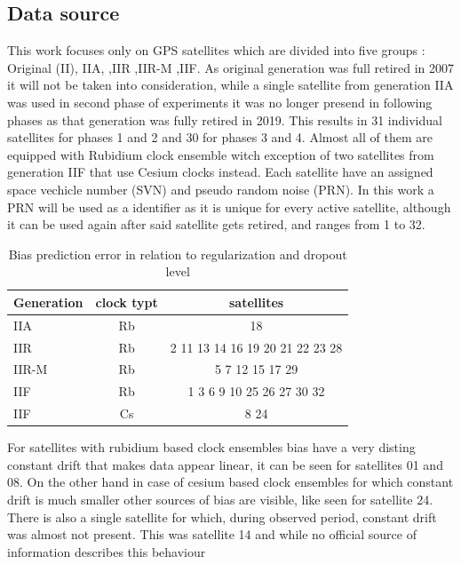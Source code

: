 \documentclass{kybernetika}
\begin{document}
\subsection{Data source}
This work focuses only on GPS satellites which are divided into five groups :
Original (II), IIA, ,IIR ,IIR-M ,IIF.
As original generation was full retired in 2007 it will not be taken into consideration, while
a single satellite from generation IIA was used in second phase of experiments it was no longer
presend in following phases as that generation was fully retired in 2019.
This results in 31 individual satellites for phases 1 and 2 and 30 for phases 3 and 4.
Almost all of them are equipped with Rubidium clock ensemble witch exception of two satellites
from generation IIF that use Cesium clocks instead.
Each satellite have an assigned space vechicle number (SVN) and pseudo random noise (PRN).
In this work a PRN will be used as a identifier as it is unique for every active satellite, 
although it can be used again after said satellite gets retired, and ranges from 1 to 32.
\begin{table}[ht] \label{table:2}
\parindent0pt
\caption{Bias prediction error in relation to regularization and dropout level}
\centering
\begin{tabular}{ l  c  c }
  \hline
  \hline
  Generation& clock typt& satellites\\  \hline
  IIA & Rb& 18\\  
  IIR & Rb& 2 11 13 14 16 19 20 21 22 23 28\\ 
  IIR-M & Rb& 5 7 12 15 17 29\\ 
  IIF & Rb& 1 3 6 9 10 25 26 27 30 32\\ 
  IIF & Cs& 8 24 \\ \hline \hline
 \end{tabular}
\end{table}
For satellites with rubidium based clock ensembles bias have a very disting constant drift
that makes data appear linear, it can be seen for satellites 01 and 08. 
On the other hand in case of cesium based clock ensembles for which constant drift is much 
smaller other sources of bias are visible, like seen for satellite 24.
There is also a single satellite for which, during observed period, constant drift was almost
not present. This was satellite 14 and while no official source of information describes this 
behaviour
\end{document}
